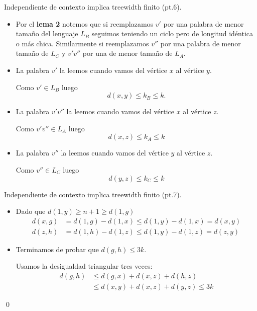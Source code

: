 \documentclass[aspectratio=169, 11pt]{beamer}
\begin{document}
	\begin{frame}[fragile]{Independiente de contexto implica treewidth finito (pt.6).}
		\begin{itemize}
			\item 
				Por el \textbf{lema 2} notemos que si reemplazamos $v'$ por una palabra de menor tamaño del lenguaje $L_B$ seguimos teniendo un ciclo pero de longitud idéntica o más chica.
				Similarmente si reemplazamos $v''$ por una palabra de menor tamaño de $L_{C}$ y $v'v''$ por una de menor tamaño de $L_{A}$. 
				
			\item
				La palabra $v'$ la leemos cuando vamos del vértice $x$ al vértice $y$.

				Como $v' \in L_{B}$ luego 
				\[
					d(x,y) \le k_{B} \le k.	
				\]

			\item 
				La palabra $v'v''$ la leemos cuando vamos del vértice $x$ al vértice $z$.

				Como $v'v'' \in L_{A}$ luego 
				\[
					d(x,z) \le k_{A} \le k	
				\]

			\item 
				La palabra $v''$ la leemos cuando vamos del vértice $y$ al vértice $z$.

				Como $v'' \in L_{C}$ luego 
				\[
					d(y,z) \le k_{C} \le k	
				\] 

		\end{itemize}
	\end{frame}
	\begin{frame}[fragile]{Independiente de contexto implica treewidth finito (pt.7).}
		\begin{itemize}
			\item 
				Dado que $d(1,y) \ge n+1 \ge d(1,g)$ 
				\begin{align*}
					d(x,g) &= d(1,g) - d(1,x)  \le d(1,y) - d(1,x) = d(x,y) \\
					d(z,h) &= d(1,h) - d(1,z)  \le d(1,y) - d(1,z) = d(z,y)
				\end{align*}
			\item 
				Terminamos de probar que $d(g,h) \le 3k$. 
				
				Usamos la desigualdad triangular tres veces:
				\begin{align*}
					d(g,h) & \le d(g,x) + d(x,z) + d(h,z) \\
					& \le d(x,y) + d(x,z) + d(y,z) \le 3k
				\end{align*}
		\end{itemize}
		\qed
	\end{frame}

	\begin{frame}


		\TODO{}
	\end{frame}
\end{document}
